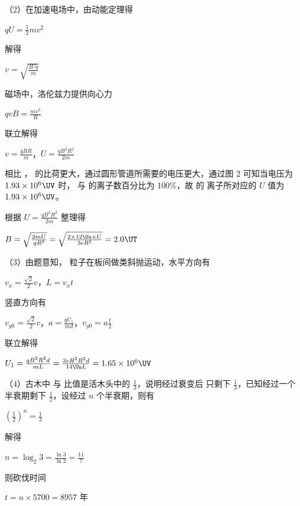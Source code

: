 \documentclass[\gkver]{gaokaozhenti}
\begin{document}
\begin{enumerate}
{（2）在加速电场中，由动能定理得

$qU = \frac{1}{2}mv^{2}$

解得

$v = \sqrt{\frac{2Uq}{m}}$

磁场中，洛伦兹力提供向心力

$qvB = \frac{mv^{2}}{R}$

联立解得

$v = \frac{qBR}{m}$，$U = \frac{qB^{2}R^{2}}{2m}$

相比 ， 的比荷更大，通过圆形管道所需要的电压更大，通过图 2 可知当电压为 $1.93 \times 10^{6} \UV$ 时， 与  的离子数百分比为 100\%，故  的  离子所对应的 $U$ 值为 $1.93 \times 10^{6} \UV$。

根据 $U = \frac{qB^{2}R^{2}}{2m}$ 整理得

$B = \sqrt{\frac{2mU}{qR^{2}}} = \sqrt{\frac{2 \times 12\Uu \times U}{3eR^{2}}} = 2.0 \UT$

（3）由题意知， 粒子在板间做类斜抛运动，水平方向有

$v_{x} = \frac{\sqrt{2}}{2}v$，$L = v_{x}t$

竖直方向有

$v_{y0} = \frac{\sqrt{2}}{2}v$，$a = \frac{qU_{1}}{md}$，$v_{y0} = a\frac{t}{2}$

联立解得

$U_{1} = \frac{qB^{2}R^{2}d}{mL} = \frac{3eB^{2}R^{2}d}{14\Uu L} = 1.65 \times 10^{6} \UV$

（4）古木中  与  比值是活木头中的 $\frac{1}{3}$，说明经过衰变后  只剩下 $\frac{1}{3}$，已知经过一个半衰期剩下 $\frac{1}{2}$，设经过 $n$ 个半衰期，则有

$\left( \frac{1}{2} \right)^{n} = \frac{1}{3}$

解得

$n = \log_{2}3 = \frac{\ln 3}{\ln 2} = \frac{11}{7}$

则砍伐时间

$t = n \times 5700 = 8957$ 年
}

\end{enumerate}
\end{document}
